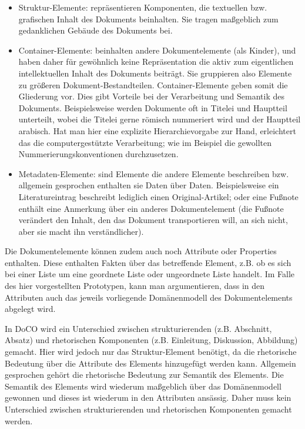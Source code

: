  
\begin{itemize}

\item Struktur-Elemente: repräsentieren Komponenten, die textuellen bzw. grafischen Inhalt des Dokuments beinhalten. Sie tragen maßgeblich zum gedanklichen Gebäude des Dokuments bei.
\item Container-Elemente: beinhalten andere Dokumentelemente (als Kinder), und haben daher für gewöhnlich keine Repräsentation die aktiv zum eigentlichen intellektuellen Inhalt des Dokuments beiträgt. Sie gruppieren also Elemente zu größeren Dokument-Bestandteilen. Container-Elemente geben somit die Gliederung vor. Dies gibt Vorteile bei der Verarbeitung und Semantik des Dokuments. Beispielsweise werden Dokumente oft in Titelei und Hauptteil unterteilt, wobei die Titelei gerne römisch nummeriert wird und der Hauptteil arabisch. Hat man hier eine explizite Hierarchievorgabe zur Hand, erleichtert das die computergestützte Verarbeitung; wie im Beispiel die gewollten Nummerierungskonventionen durchzusetzen.
\item Metadaten-Elemente: sind Elemente die andere Elemente beschreiben bzw. allgemein gesprochen enthalten sie Daten über Daten. Beispielsweise ein Literatureintrag beschreibt lediglich einen Original-Artikel; oder eine Fußnote enthält eine Anmerkung über ein anderes Dokumentelement (die Fußnote verändert den Inhalt, den das Dokument transportieren will, an sich nicht, aber sie macht ihn verständlicher).
\end{itemize}
 
Die Dokumentelemente können zudem auch noch Attribute oder Properties enthalten. Diese enthalten Fakten über das betreffende Element, z.B. ob es sich bei einer Liste um eine geordnete Liste oder ungeordnete Liste handelt. Im Falle des hier vorgestellten Prototypen, kann man argumentieren, dass in den Attributen auch das jeweils vorliegende Domänenmodell des Dokumentelements abgelegt wird.

 
In DoCO wird ein Unterschied zwischen strukturierenden (z.B. Abschnitt, Absatz) und rhetorischen Komponenten (z.B. Einleitung, Diskussion, Abbildung) gemacht. Hier wird jedoch nur das Struktur-Element benötigt, da die rhetorische Bedeutung über die Attribute des Elements hinzugefügt werden kann. Allgemein gesprochen gehört die rhetorische Bedeutung zur Semantik des Elements. Die Semantik des Elements wird wiederum maßgeblich über das Domänenmodell gewonnen und dieses ist wiederum in den Attributen ansässig. Daher muss kein Unterschied zwischen strukturierenden und rhetorischen Komponenten gemacht werden.

